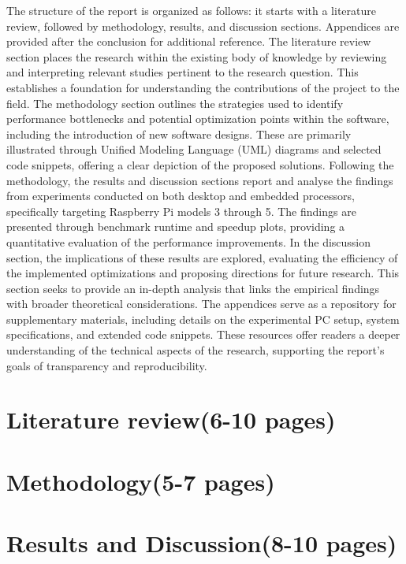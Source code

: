 \documentclass[12pt]{article}
\begin{document}
The structure of the report is organized as follows: it starts with a literature review, followed by methodology, results, and discussion sections. Appendices are provided after the conclusion for additional reference. The literature review section places the research within the existing body of knowledge by reviewing and interpreting relevant studies pertinent to the research question. This establishes a foundation for understanding the contributions of the project to the field. The methodology section outlines the strategies used to identify performance bottlenecks and potential optimization points within the software, including the introduction of new software designs. These are primarily illustrated through Unified Modeling Language (UML) diagrams and selected code snippets, offering a clear depiction of the proposed solutions. Following the methodology, the results and discussion sections report and analyse the findings from experiments conducted on both desktop and embedded processors, specifically targeting Raspberry Pi models 3 through 5. The findings are presented through benchmark runtime and speedup plots, providing a quantitative evaluation of the performance improvements. In the discussion section, the implications of these results are explored, evaluating the efficiency of the implemented optimizations and proposing directions for future research. This section seeks to provide an in-depth analysis that links the empirical findings with broader theoretical considerations. The appendices serve as a repository for supplementary materials, including details on the experimental PC setup, system specifications, and extended code snippets. These resources offer readers a deeper understanding of the technical aspects of the research, supporting the report's goals of transparency and reproducibility. 

\newpage
\section{Literature review(6-10 pages)}



\newpage
\section{Methodology(5-7 pages)}


\section{Results and Discussion(8-10 pages)}
\end{document}
